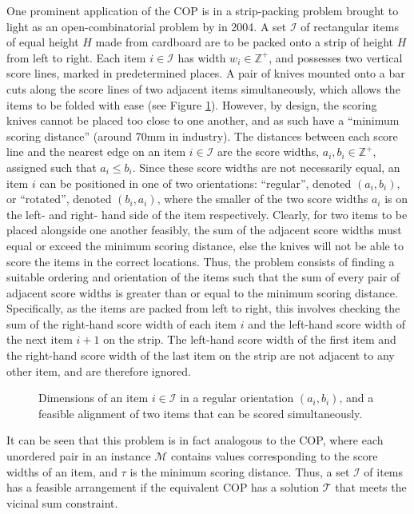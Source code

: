 \documentclass[oribibl]{llncs}
\begin{document}
One prominent application of the COP is in a strip-packing problem brought to light as an open-combinatorial problem by \citeauthor{goulimis2004} in 2004. A set $\mathcal{I}$ of rectangular items of equal height $H$ made from cardboard are to be packed onto a strip of height $H$ from left to right. Each item $i \in \mathcal{I}$ has width $w_i \in \mathbb{Z}^{+}$, and possesses two vertical score lines, marked in predetermined places. A pair of knives mounted onto a bar cuts along the score lines of two adjacent items simultaneously, which allows the items to be folded with ease (see Figure \ref{fig:itemsknife}). However, by design, the scoring knives cannot be placed too close to one another, and as such have a ``minimum scoring distance'' (around 70mm in industry). The distances between each score line and the nearest edge on an item $i \in \mathcal{I}$ are the score widths, $a_i, b_i \in \mathbb{Z}^{+}$, assigned such that $a_i \leq b_i$. Since these score widths are not necessarily equal, an item $i$ can be positioned in one of two orientations: ``regular'', denoted $(a_i, b_i)$, or ``rotated'', denoted $(b_i, a_i)$, where the smaller of the two score widths $a_i$ is on the left- and right- hand side of the item respectively. Clearly, for two items to be placed alongside one another feasibly, the sum of the adjacent score widths must equal or exceed the minimum scoring distance, else the knives will not be able to score the items in the correct locations. Thus, the problem consists of finding a suitable ordering and orientation of the items such that the sum of every pair of adjacent score widths is greater than or equal to the minimum scoring distance. Specifically, as the items are packed from left to right, this involves checking the sum of the right-hand score width of each item $i$ and the left-hand score width of the next item $i+1$ on the strip. The left-hand score width of the first item and the right-hand score width of the last item on the strip are not adjacent to any other item, and are therefore ignored. 

\begin{figure}[h!]	
	\centering
	
	\caption{Dimensions of an item $i \in \mathcal{I}$ in a regular orientation $(a_i, b_i)$, and a feasible alignment of two items that can be scored simultaneously.}	
	\label{fig:itemsknife}
\end{figure}


It can be seen that this problem is in fact analogous to the COP, where each unordered pair in an instance $\mathcal{M}$ contains values corresponding to the score widths of an item, and $\tau$ is the minimum scoring distance. Thus, a set $\mathcal{I}$ of items has a feasible arrangement if the equivalent COP has a solution $\mathcal{T}$ that meets the vicinal sum constraint.
\end{document}
